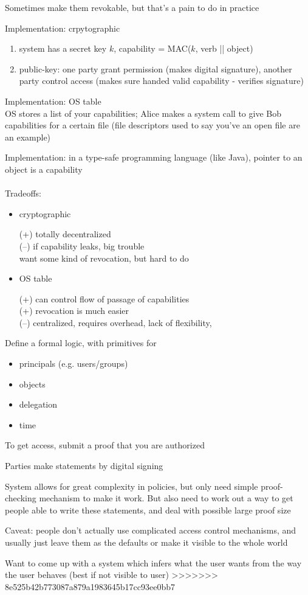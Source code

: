 Sometimes make them revokable, but that's a pain to do in practice

Implementation: crpytographic
\begin{enumerate}
    \item system has a secret key $k$, capability = MAC($k$, verb || object)
    \item public-key: one party grant permission (makes digital signature),
    another party control access (makes sure handed valid capability - verifies
    signature)
\end{enumerate}
Implementation: OS table\\
OS stores a list of your capabilities; Alice makes a system call to give Bob
capabilities for a certain file (file descriptors used to say you've an open
file are an example)

Implementation: in a type-safe programming language (like Java), pointer to an
object is a capability
\\
\\
Tradeoffs:
\begin{itemize}
    \item cryptographic

    (+) totally decentralized \\
    (--) if capability leaks, big trouble\\
    want some kind of revocation, but hard to do
    
    \item OS table
    
    (+) can control flow of passage of capabilities\\
    (+) revocation is much easier\\
    (--) centralized, requires overhead, lack of flexibility, 
\end{itemize}

Define a formal logic, with primitives for
\begin{itemize}
    \item principals (e.g. users/groups)
    \item objects
    \item delegation
    \item time
\end{itemize}
To get access, submit a proof that you are authorized

Parties make statements by digital signing

System allows for great complexity in policies, but only need simple proof-
checking mechanism to make it work. But also need to work out a way to get
people able to write these statements, and deal with possible large proof size

Caveat: people don't actually use complicated access control mechanisms, and
usually just leave them as the defaults or make it visible to the whole world

Want to come up with a system which infers what the user wants from the way the
user behaves (best if not visible to user)
>>>>>>> 8e525b42b773087a879a1983645b17cc93ee0bb7
